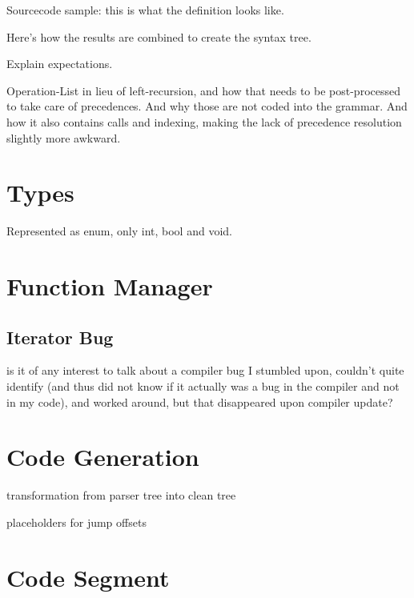         Sourcecode sample: this is what the definition looks like.
        
        Here's how the results are combined to create the syntax tree.
        
        Explain expectations.
        
        Operation-List in lieu of left-recursion, and how that needs to be post-processed to take care of precedences. And why those are not coded into the grammar. And how it also contains calls and indexing, making the lack of precedence resolution slightly more awkward.
    
    \section{Types}
        
        Represented as enum, only int, bool and void.
    
    \section{Function Manager}
    
        
        \subsection{Iterator Bug}
            
            is it of any interest to talk about a compiler bug I stumbled upon, couldn't quite identify (and thus did not know if it actually was a bug in the compiler and not in my code), and worked around, but that disappeared upon compiler update?
    
    \section{Code Generation}
    
        transformation from parser tree into clean tree
    
        placeholders for jump offsets
        
    \section{Code Segment}
        
